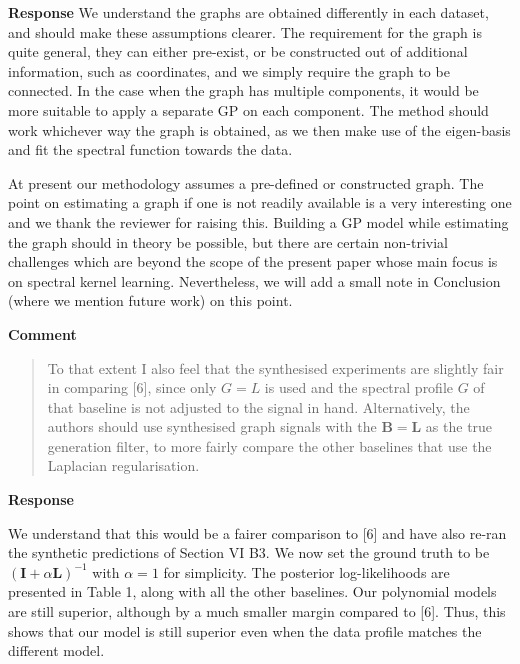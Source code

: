 \documentclass[11pt,onecolumn,journal]{IEEEtran}
\theoremstyle{definition}
\begin{document}
\textbf{Response}
We understand the graphs are obtained differently in each dataset, and should make these assumptions clearer. The requirement for the graph is quite general, they can either pre-exist, or be constructed out of additional information, such as coordinates, and we simply require the graph to be connected. In the case when the graph has multiple components, it would be more suitable to apply a separate GP on each component. The method should work whichever way the graph is obtained, as we then make use of the eigen-basis and fit the spectral function towards the data.

At present our methodology assumes a pre-defined or constructed graph. The point on estimating a graph if one is not readily available is a very interesting one and we thank the reviewer for raising this. Building a GP model while estimating the graph should in theory be possible, but there are certain non-trivial challenges which are beyond the scope of the present paper whose main focus is on spectral kernel learning. Nevertheless, we will add a small note in Conclusion (where we mention future work) on this point.

\textbf{Comment}
\begin{quote}
To that extent I also feel that the synthesised experiments are slightly fair in comparing [6], since only $G=L$ is used and the spectral profile $G$ of that baseline is not adjusted to the signal in hand. Alternatively, the authors should use synthesised graph signals with the $\mathbf{B}=\mathbf{L}$ as the true generation filter, to more fairly compare the other baselines that use the Laplacian regularisation.
\end{quote}

\textbf{Response}

We understand that this would be a fairer comparison to [6] and have also re-ran the synthetic predictions of Section VI B3. We now set the ground truth to be $(\mathbf{I} + \alpha\mathbf{L})^{-1}$ with $\alpha = 1$ for simplicity. The posterior log-likelihoods are presented in Table 1, along with all the other baselines. Our polynomial models are still superior, although by a much smaller margin compared to [6]. Thus, this shows that our model is still superior even when the data profile matches the different model.
\end{document}
